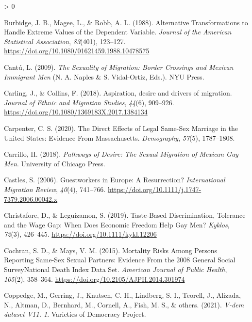 \documentclass[
  12pt,
]{article}
\newlength{\cslhangindent}
\newenvironment{CSLReferences}[2] %
 {%
  \setlength{\parindent}{0pt}
  \ifodd #1 \everypar{\setlength{\hangindent}{\cslhangindent}}\ignorespaces\fi
  \ifnum #2 > 0
  \setlength{\parskip}{#2\baselineskip}
  \fi
 }%
 {}
\begin{document}
\begin{CSLReferences}{1}{0}
\leavevmode\hypertarget{ref-burbidge_1988_alternative}{}%
Burbidge, J. B., Magee, L., \& Robb, A. L. (1988). Alternative {Transformations} to {Handle Extreme Values} of the {Dependent Variable}. \emph{Journal of the American Statistical Association}, \emph{83}(401), 123--127. \url{https://doi.org/10.1080/01621459.1988.10478575}

\leavevmode\hypertarget{ref-cantu_2009}{}%
Cantú, L. (2009). \emph{The {Sexuality} of {Migration}: Border {Crossings} and {Mexican Immigrant Men}} (N. A. Naples \& S. Vidal-Ortiz, Eds.). {NYU Press}.

\leavevmode\hypertarget{ref-carling_2018_aspiration}{}%
Carling, J., \& Collins, F. (2018). Aspiration, desire and drivers of migration. \emph{Journal of Ethnic and Migration Studies}, \emph{44}(6), 909--926. \url{https://doi.org/10.1080/1369183X.2017.1384134}

\leavevmode\hypertarget{ref-carpenter_2020}{}%
Carpenter, C. S. (2020). The {Direct Effects} of {Legal Same}-{Sex Marriage} in the {United States}: Evidence {From Massachusetts}. \emph{Demography}, \emph{57}(5), 1787--1808.

\leavevmode\hypertarget{ref-carrillo_2018}{}%
Carrillo, H. (2018). \emph{Pathways of {Desire}: The {Sexual Migration} of {Mexican Gay Men}}. {University of Chicago Press}.

\leavevmode\hypertarget{ref-castles_2006}{}%
Castles, S. (2006). Guestworkers in {Europe}: A {Resurrection}? \emph{International Migration Review}, \emph{40}(4), 741--766. \url{https://doi.org/10.1111/j.1747-7379.2006.00042.x}

\leavevmode\hypertarget{ref-christafore_2019}{}%
Christafore, D., \& Leguizamon, S. (2019). Taste-{Based Discrimination}, {Tolerance} and the {Wage Gap}: When {Does Economic Freedom Help Gay Men}? \emph{Kyklos}, \emph{72}(3), 426--445. \url{https://doi.org/10.1111/kykl.12206}

\leavevmode\hypertarget{ref-cochran_2015_mortality}{}%
Cochran, S. D., \& Mays, V. M. (2015). Mortality {Risks Among Persons Reporting Same}-{Sex Sexual Partners}: Evidence {From} the 2008 {General Social Survey}{{National Death Index Data Set}}. \emph{American Journal of Public Health}, \emph{105}(2), 358--364. \url{https://doi.org/10.2105/AJPH.2014.301974}

\leavevmode\hypertarget{ref-coppedge_2021}{}%
Coppedge, M., Gerring, J., Knutsen, C. H., Lindberg, S. I., Teorell, J., Alizada, N., Altman, D., Bernhard, M., Cornell, A., Fish, M. S., \& others. (2021). \emph{V-dem dataset V11. 1}. {Varieties of Democracy Project}.


\end{CSLReferences}
\end{document}
